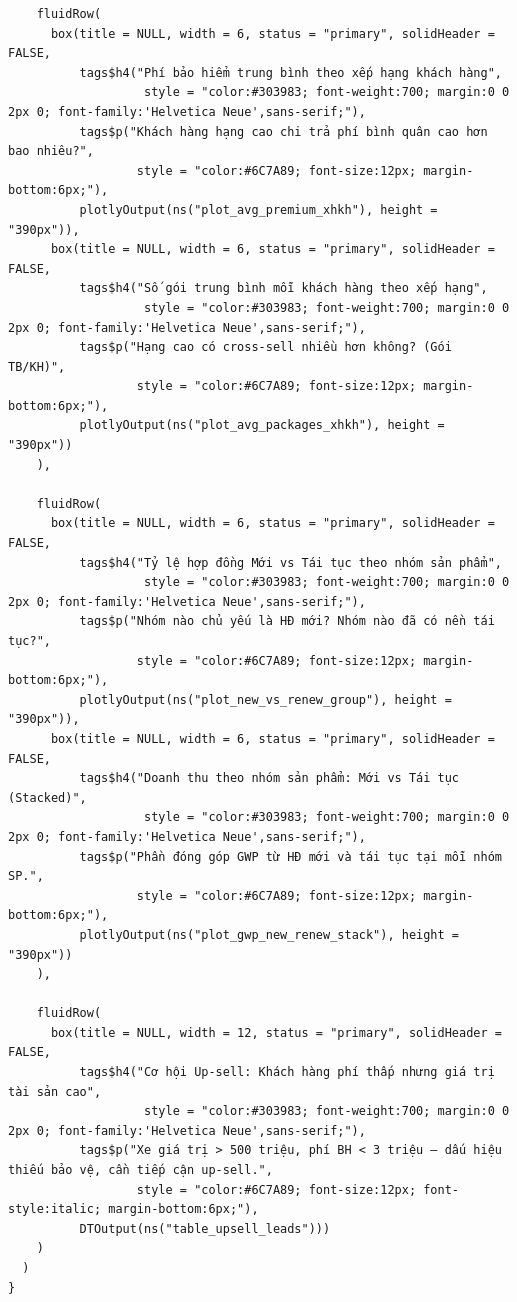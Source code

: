 \documentclass[12pt, a4paper]{article}
\begin{document}
\begin{lstlisting}
    fluidRow(
      box(title = NULL, width = 6, status = "primary", solidHeader = FALSE,
          tags$h4("Phí bảo hiểm trung bình theo xếp hạng khách hàng",
                   style = "color:#303983; font-weight:700; margin:0 0 2px 0; font-family:'Helvetica Neue',sans-serif;"),
          tags$p("Khách hàng hạng cao chi trả phí bình quân cao hơn bao nhiêu?",
                  style = "color:#6C7A89; font-size:12px; margin-bottom:6px;"),
          plotlyOutput(ns("plot_avg_premium_xhkh"), height = "390px")),
      box(title = NULL, width = 6, status = "primary", solidHeader = FALSE,
          tags$h4("Số gói trung bình mỗi khách hàng theo xếp hạng",
                   style = "color:#303983; font-weight:700; margin:0 0 2px 0; font-family:'Helvetica Neue',sans-serif;"),
          tags$p("Hạng cao có cross-sell nhiều hơn không? (Gói TB/KH)",
                  style = "color:#6C7A89; font-size:12px; margin-bottom:6px;"),
          plotlyOutput(ns("plot_avg_packages_xhkh"), height = "390px"))
    ),

    fluidRow(
      box(title = NULL, width = 6, status = "primary", solidHeader = FALSE,
          tags$h4("Tỷ lệ hợp đồng Mới vs Tái tục theo nhóm sản phẩm",
                   style = "color:#303983; font-weight:700; margin:0 0 2px 0; font-family:'Helvetica Neue',sans-serif;"),
          tags$p("Nhóm nào chủ yếu là HĐ mới? Nhóm nào đã có nền tái tục?",
                  style = "color:#6C7A89; font-size:12px; margin-bottom:6px;"),
          plotlyOutput(ns("plot_new_vs_renew_group"), height = "390px")),
      box(title = NULL, width = 6, status = "primary", solidHeader = FALSE,
          tags$h4("Doanh thu theo nhóm sản phẩm: Mới vs Tái tục (Stacked)",
                   style = "color:#303983; font-weight:700; margin:0 0 2px 0; font-family:'Helvetica Neue',sans-serif;"),
          tags$p("Phần đóng góp GWP từ HĐ mới và tái tục tại mỗi nhóm SP.",
                  style = "color:#6C7A89; font-size:12px; margin-bottom:6px;"),
          plotlyOutput(ns("plot_gwp_new_renew_stack"), height = "390px"))
    ),

    fluidRow(
      box(title = NULL, width = 12, status = "primary", solidHeader = FALSE,
          tags$h4("Cơ hội Up-sell: Khách hàng phí thấp nhưng giá trị tài sản cao",
                   style = "color:#303983; font-weight:700; margin:0 0 2px 0; font-family:'Helvetica Neue',sans-serif;"),
          tags$p("Xe giá trị > 500 triệu, phí BH < 3 triệu — dấu hiệu thiếu bảo vệ, cần tiếp cận up-sell.",
                  style = "color:#6C7A89; font-size:12px; font-style:italic; margin-bottom:6px;"),
          DTOutput(ns("table_upsell_leads")))
    )
  )
}


\end{lstlisting}
\end{document}

